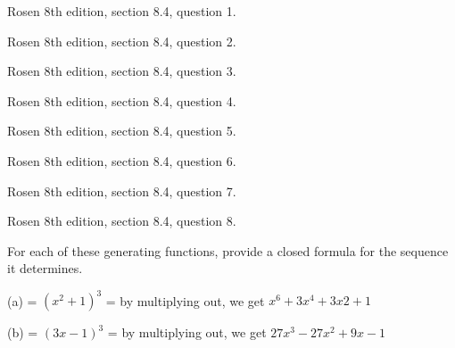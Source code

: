 \newpage
\nextq Rosen 8th edition, section 8.4, question 1.

\SOLUTION



\newpage
\nextq Rosen 8th edition, section 8.4, question 2.

\SOLUTION



\newpage
\nextq Rosen 8th edition, section 8.4, question 3.

\SOLUTION



\newpage
\nextq Rosen 8th edition, section 8.4, question 4.

\SOLUTION



\newpage
\nextq Rosen 8th edition, section 8.4, question 5.

\SOLUTION



\newpage
\nextq Rosen 8th edition, section 8.4, question 6.

\SOLUTION



\newpage
\nextq Rosen 8th edition, section 8.4, question 7.

\SOLUTION



\newpage
\nextq Rosen 8th edition, section 8.4, question 8.

\SOLUTION

For each of these generating functions, provide a closed
formula for the sequence it determines.

(a) = $(x^2+1)^3$ = by multiplying out, we get $x^6 + 3x^4 + 3x2 + 1$

(b) = $(3x-1)^3$ = by multiplying out, we get $27x^3-27x^2+9x-1$

